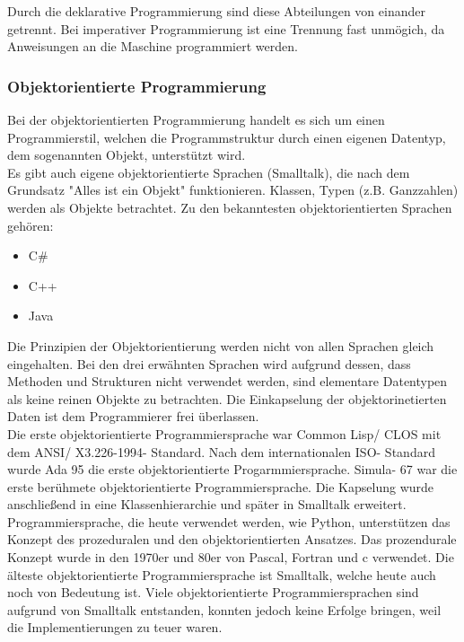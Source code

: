 \documentclass[12pt,a4paper]{report}
\begin{document}
\begin{onehalfspace}
Durch die deklarative Programmierung sind diese Abteilungen von einander getrennt. Bei imperativer Programmierung ist eine Trennung fast unmögich, da Anweisungen an die Maschine programmiert werden.

\subsubsection{Objektorientierte Programmierung}
Bei der objektorientierten Programmierung handelt es sich um einen Programmierstil, welchen die Programmstruktur durch einen eigenen Datentyp, dem sogenannten Objekt, unterstützt wird.\\

Es gibt auch eigene objektorientierte Sprachen (Smalltalk), die nach dem Grundsatz "{}Alles ist ein Objekt"{} funktionieren. Klassen, Typen (z.B. Ganzzahlen) werden als Objekte betrachtet. Zu den bekanntesten objektorientierten Sprachen gehören:
\begin{itemize}
\item C\#
\item C++
\item Java
\end{itemize}
Die Prinzipien der Objektorientierung werden nicht von allen Sprachen gleich eingehalten. Bei den drei erwähnten Sprachen wird aufgrund dessen, dass Methoden und Strukturen nicht verwendet werden, sind elementare Datentypen als keine reinen Objekte zu betrachten. Die Einkapselung der objektorinetierten Daten ist dem Programmierer frei überlassen.\\

Die erste objektorientierte Programmiersprache war Common Lisp/ CLOS mit dem ANSI/ X3.226-1994- Standard. Nach dem internationalen ISO- Standard wurde Ada 95 die erste objektorientierte Progarmmiersprache.
Simula- 67 war die erste berühmete objektorientierte Programmiersprache. Die Kapselung wurde anschließend in eine Klassenhierarchie und später in Smalltalk erweitert.\\

Programmiersprache, die heute verwendet werden, wie Python, unterstützen das Konzept des prozeduralen und den objektorientierten Ansatzes. Das prozendurale Konzept wurde in den 1970er und 80er von Pascal, Fortran und c verwendet. Die älteste objektorientierte Programmiersprache ist Smalltalk, welche heute auch noch von Bedeutung ist. Viele objektorientierte Programmiersprachen sind aufgrund von Smalltalk entstanden, konnten jedoch keine Erfolge bringen, weil die Implementierungen zu teuer waren.\\


\end{onehalfspace}
\end{document}
